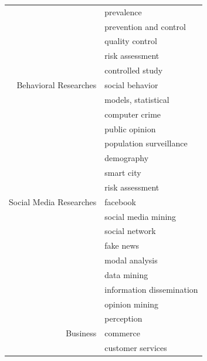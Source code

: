 \begin{center}
\begin{longtable}{ rl }
                                & prevalence                      \\
                                & prevention and control          \\
                                & quality control                 \\
                                & risk assessment                 \\
                                & controlled study                \\
        Behavioral Researches   & social behavior                 \\
                                & models, statistical             \\
                                & computer crime                  \\
                                & public opinion                  \\
                                & population surveillance         \\
                                & demography                      \\
                                & smart city                      \\
                                & risk assessment                 \\
        Social Media Researches & facebook                        \\
                                & social media mining             \\
                                & social network                  \\
                                & fake news                       \\
                                & modal analysis                  \\
                                & data mining                     \\
                                & information dissemination       \\
                                & opinion mining                  \\
                                & perception                      \\
        Business                & commerce                        \\
                                & customer services               \\

\end{longtable}
\end{center}
